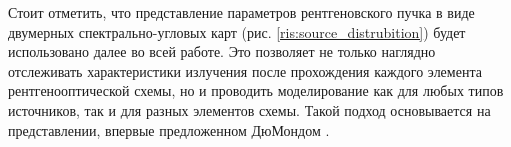 Стоит отметить, что представление параметров рентгеновского пучка
 в виде двумерных спектрально-угловых карт (рис. \ref{ris:source_distrubition})
 будет использовано далее во всей работе. Это позволяет не только наглядно отслеживать
характеристики излучения после прохождения каждого элемента рентгенооптической
схемы, но и проводить моделирование как для любых типов источников, так
и для разных элементов схемы. Такой подход основывается на представлении, впервые предложенном
ДюМондом \cite{Dumond1937}.
